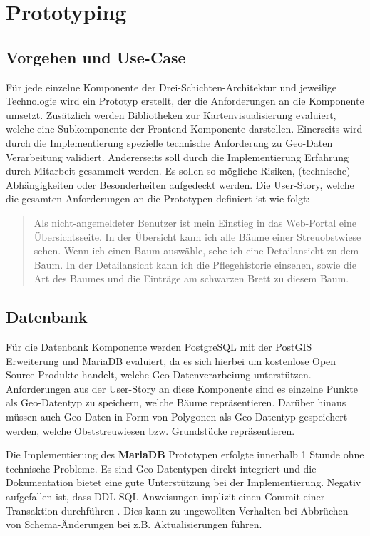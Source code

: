 \section{Prototyping}
\label{sec:Prototyping}

\subsection{Vorgehen und Use-Case}
Für jede einzelne Komponente der Drei-Schichten-Architektur und jeweilige Technologie wird ein Prototyp erstellt, der die Anforderungen an die Komponente umsetzt.
Zusätzlich werden Bibliotheken zur Kartenvisualisierung evaluiert, welche eine Subkomponente der Frontend-Komponente darstellen.
Einerseits wird durch die Implementierung spezielle technische Anforderung zu Geo-Daten Verarbeitung validiert.
Andererseits soll durch die Implementierung Erfahrung durch Mitarbeit gesammelt werden.
Es sollen so mögliche Risiken, (technische) Abhängigkeiten oder Besonderheiten aufgedeckt werden.
Die User-Story, welche die gesamten Anforderungen an die Prototypen definiert ist wie folgt:

\begin{quote}
	Als nicht-angemeldeter Benutzer ist mein Einstieg in das Web-Portal eine Übersichtsseite.
	In der Übersicht kann ich alle Bäume einer Streuobstwiese sehen. 
	Wenn ich einen Baum auswähle, sehe ich eine Detailansicht zu dem Baum. 
	In der Detailansicht kann ich die Pflegehistorie einsehen, sowie die Art des Baumes und die Einträge am schwarzen Brett zu diesem Baum. 
\end{quote}

\subsection{Datenbank}
Für die Datenbank Komponente werden PostgreSQL mit der PostGIS Erweiterung und MariaDB evaluiert, da es sich hierbei um kostenlose Open Source Produkte handelt, welche Geo-Datenverarbeiung unterstützen.
Anforderungen aus der User-Story an diese Komponente sind es einzelne Punkte als Geo-Datentyp zu speichern, welche Bäume repräsentieren.
Darüber hinaus müssen auch Geo-Daten in Form von Polygonen als Geo-Datentyp gespeichert werden, welche Obststreuwiesen bzw. Grundstücke repräsentieren.

Die Implementierung des \textbf{MariaDB} Prototypen erfolgte innerhalb 1 Stunde ohne technische Probleme.
Es sind Geo-Datentypen direkt integriert und die Dokumentation bietet eine gute Unterstützung bei der Implementierung.
Negativ aufgefallen ist, dass \ac{DDL} SQL-Anweisungen implizit einen Commit einer Transaktion durchführen \autocite[vgl.][]{MariaDB.od}.
Dies kann zu ungewollten Verhalten bei Abbrüchen von Schema-Änderungen bei z.B. Aktualisierungen führen.


